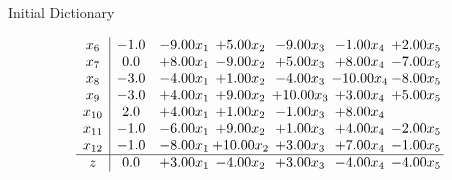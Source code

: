 \documentclass[8pt]{article}
\begin{document}
Initial Dictionary 

\[\begin{array}{c| c c@{\hskip 2pt} c@{\hskip 2pt} c@{\hskip 2pt} c@{\hskip 2pt} c@{\hskip 2pt} }
 x_{6}   &  -1.0 & -9.00 x_{1} & +  5.00 x_{2} & -9.00 x_{3} & -1.00 x_{4} & +  2.00 x_{5}\\
 x_{7}   &  0.0 & +  8.00 x_{1} & -9.00 x_{2} & +  5.00 x_{3} & +  8.00 x_{4} & -7.00 x_{5}\\
 x_{8}   &  -3.0 & -4.00 x_{1} & +  1.00 x_{2} & -4.00 x_{3} & -10.00 x_{4} & -8.00 x_{5}\\
 x_{9}   &  -3.0 & +  4.00 x_{1} & +  9.00 x_{2} & + 10.00 x_{3} & +  3.00 x_{4} & +  5.00 x_{5}\\
 x_{10}   &  2.0 & +  4.00 x_{1} & +  1.00 x_{2} & -1.00 x_{3} & +  8.00 x_{4} &   \\
 x_{11}   &  -1.0 & -6.00 x_{1} & +  9.00 x_{2} & +  1.00 x_{3} & +  4.00 x_{4} & -2.00 x_{5}\\
 x_{12}   &  -1.0 & -8.00 x_{1} & + 10.00 x_{2} & +  3.00 x_{3} & +  7.00 x_{4} & -1.00 x_{5}\\
\hline
z    &  0.0 & +  3.00 x_{1} & -4.00 x_{2} & +  3.00 x_{3} & -4.00 x_{4} & -4.00 x_{5}\\
\end{array}\]
\end{document}
